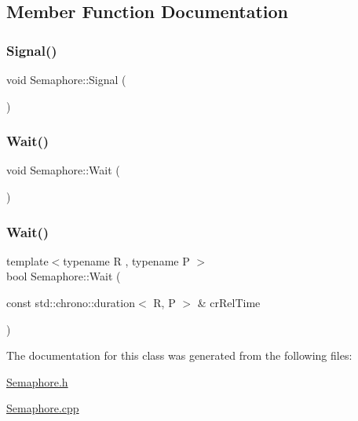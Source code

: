 \subsection{Member Function Documentation}
\mbox{\label{class_semaphore_a86f92f738b4486439b296d8e235895f2}} 
\subsubsection{\texorpdfstring{Signal()}{Signal()}}
{\footnotesize\ttfamily void Semaphore\+::\+Signal (\begin{DoxyParamCaption}{ }\end{DoxyParamCaption})}

\mbox{\label{class_semaphore_a72aabebf026e3a8b1f3e4d0fa8ee1eda}} 
\subsubsection{\texorpdfstring{Wait()}{Wait()}\hspace{0.1cm}{\footnotesize\ttfamily [1/2]}}
{\footnotesize\ttfamily void Semaphore\+::\+Wait (\begin{DoxyParamCaption}{ }\end{DoxyParamCaption})}

\mbox{\label{class_semaphore_a7f700173ae86ae623684109066e07656}} 
\subsubsection{\texorpdfstring{Wait()}{Wait()}\hspace{0.1cm}{\footnotesize\ttfamily [2/2]}}
{\footnotesize\ttfamily template$<$typename R , typename P $>$ \\
bool Semaphore\+::\+Wait (\begin{DoxyParamCaption}\item[{const std\+::chrono\+::duration$<$ R, P $>$ \&}]{cr\+Rel\+Time }\end{DoxyParamCaption})}



The documentation for this class was generated from the following files\+:\begin{DoxyCompactItemize}
\item 
\hyperlink{_semaphore_8h}{Semaphore.\+h}\item 
\hyperlink{_semaphore_8cpp}{Semaphore.\+cpp}\end{DoxyCompactItemize}
